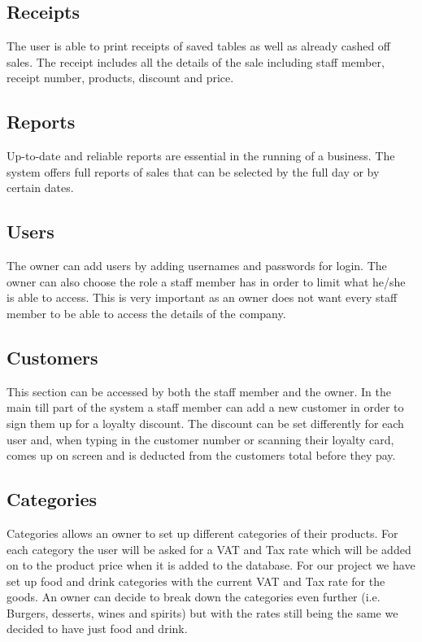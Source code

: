\subsection{Receipts}
The user is able to print receipts of saved tables as well as already cashed off sales. The receipt includes all the details of the sale including staff member, receipt number, products, discount and price.

\subsection{Reports}
Up-to-date and reliable reports are essential in the running of a business. The system offers full reports of sales that can be selected by the full day or by certain dates.

\subsection{Users}
The owner can add users by adding usernames and passwords for login. The owner can also choose the role a staff member has in order to limit what he/she is able to access. This is very important as an owner does not want every staff member to be able to access the details of the company.

\subsection{Customers}
This section can be accessed by both the staff member and the owner. In the main till part of the system a staff member can add a new customer in order to sign them up for a loyalty discount. The discount can be set differently for each user and, when typing in the customer number or scanning their loyalty card, comes up on screen and is deducted from the customers total before they pay.

\subsection{Categories}
Categories allows an owner to set up different categories of their products. For each category the user will be asked for a VAT and Tax rate which will be added on to the product price when it is added to the database. For our project we have set up food and drink categories with the current VAT and Tax rate for the goods. An owner can decide to break down the categories even further (i.e. Burgers, desserts, wines and spirits) but with the rates still being the same we decided to have just food and drink.

